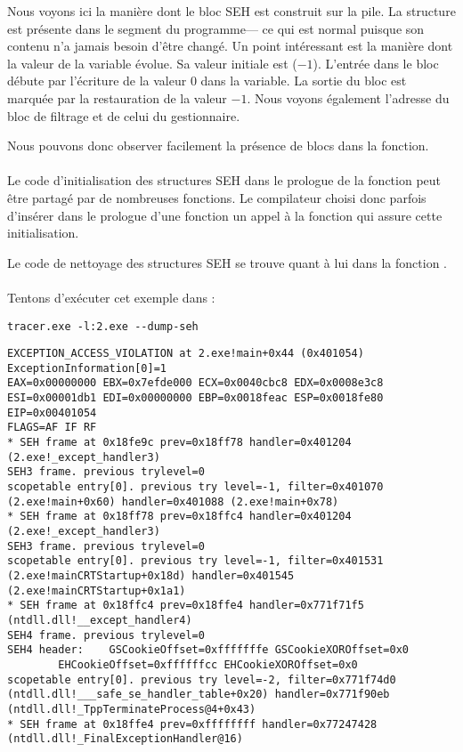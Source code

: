 Nous voyons ici la manière dont le bloc SEH est construit sur la pile.
La structure  est présente dans le segment  du programme--- ce qui est 
normal puisque son contenu n'a jamais besoin d'être changé.
Un point intéressant est la manière dont la valeur de la variable  évolue.
Sa valeur initiale est  ($-1$).
L'entrée dans le bloc  débute par l'écriture de la valeur 0 dans la variable.
La sortie du bloc  est marquée par la restauration de la valeur $-1$.
Nous voyons également l'adresse du bloc de filtrage et de celui du gestionnaire.

Nous pouvons donc observer facilement la présence de blocs  dans la fonction.\\
\\
Le code d'initialisation des structures SEH dans le prologue de la fonction peut être partagé par 
de nombreuses fonctions. Le compilateur choisi donc parfois d'insérer dans le prologue d'une fonction 
un appel à la fonction  qui assure cette initialisation.

Le code de nettoyage des structures SEH se trouve quant à lui dans la fonction .\\
\\
Tentons d'exécuter cet exemple dans \tracer{}:

\begin{lstlisting}
tracer.exe -l:2.exe --dump-seh
\end{lstlisting}

\begin{lstlisting}[caption=tracer.exe output]
EXCEPTION_ACCESS_VIOLATION at 2.exe!main+0x44 (0x401054) ExceptionInformation[0]=1
EAX=0x00000000 EBX=0x7efde000 ECX=0x0040cbc8 EDX=0x0008e3c8
ESI=0x00001db1 EDI=0x00000000 EBP=0x0018feac ESP=0x0018fe80
EIP=0x00401054
FLAGS=AF IF RF
* SEH frame at 0x18fe9c prev=0x18ff78 handler=0x401204 (2.exe!_except_handler3)
SEH3 frame. previous trylevel=0
scopetable entry[0]. previous try level=-1, filter=0x401070 (2.exe!main+0x60) handler=0x401088 (2.exe!main+0x78)
* SEH frame at 0x18ff78 prev=0x18ffc4 handler=0x401204 (2.exe!_except_handler3)
SEH3 frame. previous trylevel=0
scopetable entry[0]. previous try level=-1, filter=0x401531 (2.exe!mainCRTStartup+0x18d) handler=0x401545 (2.exe!mainCRTStartup+0x1a1)
* SEH frame at 0x18ffc4 prev=0x18ffe4 handler=0x771f71f5 (ntdll.dll!__except_handler4)
SEH4 frame. previous trylevel=0
SEH4 header:	GSCookieOffset=0xfffffffe GSCookieXOROffset=0x0
		EHCookieOffset=0xffffffcc EHCookieXOROffset=0x0
scopetable entry[0]. previous try level=-2, filter=0x771f74d0 (ntdll.dll!___safe_se_handler_table+0x20) handler=0x771f90eb (ntdll.dll!_TppTerminateProcess@4+0x43)
* SEH frame at 0x18ffe4 prev=0xffffffff handler=0x77247428 (ntdll.dll!_FinalExceptionHandler@16)
\end{lstlisting}

